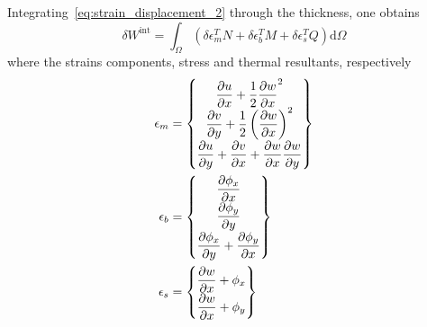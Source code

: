 \documentclass[12pt]{article}
\numberwithin{equation}{section}
\newcommand{\dpdiff}[2]{ \dfrac{\partial #1}{ \partial #2} }
\begin{document}
%
Integrating~\eqref{eq:strain_displacement_2} through the thickness, one obtains
%
\begin{equation}
    \delta W^{\text{int}} = \int_\Omega
    \left(
    \delta \epsilon_m^T N +
    \delta \epsilon_b^T M +
    \delta \epsilon_s^T Q
    \right)
    \text{d}\Omega
    \label{eq:strain_energy_3}
\end{equation}
%
where the strains components, stress and thermal resultants, respectively
%
\begin{subequations}
    {\renewcommand\arraystretch{1.75}
        \begin{align}
            \label{eq:membrane_strain}
            \epsilon_m & =
            \begin{Bmatrix}
                \dpdiff{u}{x} + \dfrac{1}{2} \dpdiff{w}{x}^2                \\
                \dpdiff{v}{y} + \dfrac{1}{2} \left(\dpdiff{w}{x}\right)^2   \\
                \dpdiff{u}{y} + \dpdiff{v}{x} + \dpdiff{w}{x} \dpdiff{w}{y} \\
            \end{Bmatrix} \\
            \label{eq:bending_strain}
            \epsilon_b & =
            \begin{Bmatrix}
                \dpdiff{\phi_x}{x}                      \\
                \dpdiff{\phi_y}{y}                      \\
                \dpdiff{\phi_x}{y} + \dpdiff{\phi_y}{x} \\
            \end{Bmatrix}                     \\
            \label{eq:shear_strain}
            \epsilon_s & =
            \begin{Bmatrix}
                \dpdiff{w}{x} + \phi_x \\
                \dpdiff{w}{x} + \phi_y
            \end{Bmatrix}
        \end{align}
        \label{eq:strains}
    }
\end{subequations}
%
\end{document}
